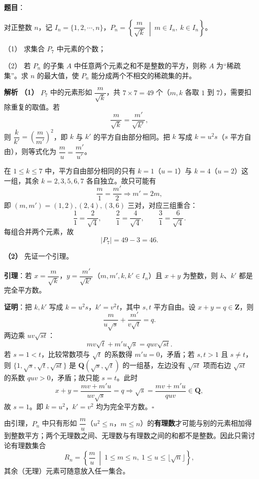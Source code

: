 \begin{answer}

\textbf{题目}：

对正整数 $n$，记 $I_n=\{1,2,\cdots,n\}$，$P_n=\left\{\dfrac{m}{\sqrt k}\ \middle|\ m\in I_n,\ k\in I_n\right\}$。

（1） 求集合 $P_7$ 中元素的个数；

（2） 若 $P_n$ 的子集 $A$ 中任意两个元素之和不是整数的平方，则称 $A$ 为“稀疏集”。求 $n$ 的最大值，使 $P_n$ 能分成两个不相交的稀疏集的并。

\textbf{解析}
\textbf{（1）} $P_7$ 中的元素形如 $\dfrac{m}{\sqrt k}$，共 $7\times7=49$ 个（$m,k$ 各取 $1$ 到 $7$），需要扣除重复的取值。若
\nopagebreak[4]
\[\frac{m}{\sqrt k}=\frac{m'}{\sqrt{k'}},\]
则 $\dfrac{k}{k'}=\left(\dfrac m{m'}\right)^2$，即 $k$ 与 $k'$ 的平方自由部分相同。把 $k$ 写成 $k=u^2s$（$s$ 平方自由），则等式化为 $\dfrac mu=\dfrac{m'}{u'}$。

在 $1\leqslant k\leqslant7$ 中，平方自由部分相同的只有 $k=1$（$u=1$）与 $k=4$（$u=2$）这一组，其余 $k=2,3,5,6,7$ 各自独立。故只可能有
\nopagebreak[4]
\[\frac m1=\frac{m'}2\Longrightarrow m'=2m,\]
即 $(m,m')=(1,2),(2,4),(3,6)$ 三对，对应三组重合：
\nopagebreak[4]
\[\frac11=\frac2{\sqrt4},\qquad \frac21=\frac4{\sqrt4},\qquad \frac31=\frac6{\sqrt4}.\]
每组合并两个元素，故
\nopagebreak[4]
\[|P_7|=49-3=46.\]

\textbf{（2）} 先证一个引理。

\textbf{引理}：若 $x=\dfrac{m}{\sqrt k}$，$y=\dfrac{m'}{\sqrt{k'}}$（$m,m',k,k'\in I_n$）且 $x+y$ 为整数，则 $k$、$k'$ 都是完全平方数。

\textbf{证明}：把 $k,k'$ 写成 $k=u^2s$，$k'=v^2t$，其中 $s,t$ 平方自由。设 $x+y=q\in\mathbf Z$，则
\nopagebreak[4]
\[\frac{m}{u\sqrt s}+\frac{m'}{v\sqrt t}=q.\]
两边乘 $uv\sqrt{st}$：
\nopagebreak[4]
\[mv\sqrt t+m'u\sqrt s=quv\sqrt{st}.\]
若 $s=1<t$，比较常数项与 $\sqrt t$ 的系数得 $m'u=0$，矛盾；若 $s,t>1$ 且 $s\neq t$，则 $\{1,\sqrt s,\sqrt t,\sqrt{st}\}$ 是 $\mathbf Q(\sqrt s,\sqrt t)$ 的一组基，左边没有 $\sqrt{st}$ 项而右边 $\sqrt{st}$ 的系数 $quv>0$，矛盾；故只能 $s=t$。此时
\nopagebreak[4]
\[x+y=\frac{mv+m'u}{uv\sqrt s}=q\Longrightarrow\sqrt s=\frac{mv+m'u}{quv}\in\mathbf Q,\]
故 $s=1$。即 $k=u^2$，$k'=v^2$ 均为完全平方数。$\square$

由引理，$P_n$ 中只有形如 $\dfrac mu$（$u^2\leqslant n$，$m\leqslant n$）的\textbf{有理数}才可能与别的元素相加得到整数平方；两个无理数之间、无理数与有理数之间的和都不是整数。因此只需讨论有理数集合
\nopagebreak[4]
\[R_n=\left\{\frac mu\ \middle|\ 1\leqslant m\leqslant n,\ 1\leqslant u\leqslant\lfloor\sqrt n\rfloor\right\},\]
其余（无理）元素可随意放入任一集合。


\end{answer}
